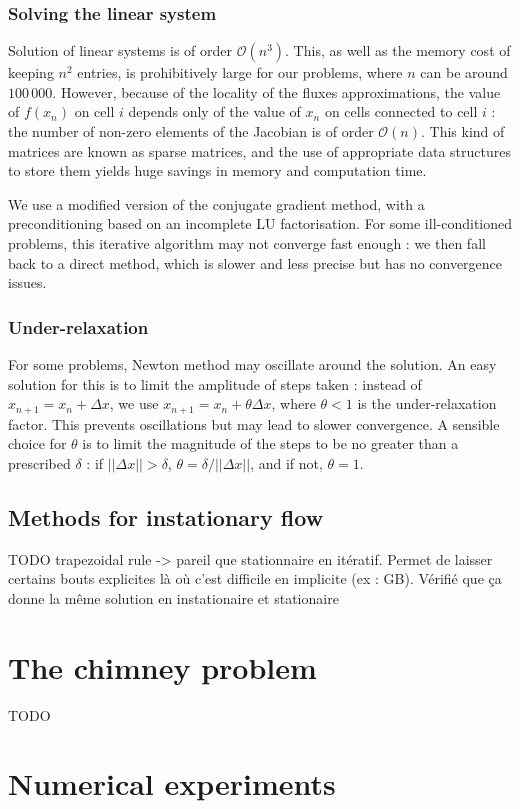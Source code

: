 \documentclass[12pt]{article}
\begin{document}
\subsubsection{Solving the linear system}
Solution of linear systems is of order $\mathcal O (n^3)$. This, as
well as the memory cost of keeping $n^2$ entries, is prohibitively
large for our problems, where $n$ can be around $100\,000$. However,
because of the locality of the fluxes approximations, the value of
$f(x_n)$ on cell $i$ depends only of the value of $x_n$ on cells
connected to cell $i$ : the number of non-zero elements of the
Jacobian is of order $\mathcal O (n)$. This kind of matrices are known
as sparse matrices, and the use of appropriate data structures to
store them yields huge savings in memory and computation time.

We use a modified version of the conjugate gradient method, with a
preconditioning based on an incomplete LU factorisation. For some
ill-conditioned problems, this iterative algorithm may not converge
fast enough : we then fall back to a direct method, which is slower
and less precise but has no convergence issues.

\subsubsection{Under-relaxation}
For some problems, Newton method may oscillate around the solution. An
easy solution for this is to limit the amplitude of steps taken :
instead of $x_{n+1} = x_n + \Delta x$, we use $x_{n+1} = x_n +\theta
\Delta x$, where $\theta < 1$ is the under-relaxation factor. This
prevents oscillations but may lead to slower convergence. A sensible
choice for $\theta$ is to limit the magnitude of the steps to be no
greater than a prescribed $\delta$ : if $||\Delta x|| > \delta$,
$\theta = \delta / ||\Delta x||$, and if not, $\theta = 1$.

\subsection{Methods for instationary flow}
TODO
trapezoidal rule -> pareil que stationnaire en itératif. Permet de
laisser certains bouts explicites là où c'est difficile en implicite
(ex : GB). Vérifié que ça donne la même solution en instationaire et stationaire
\section{The chimney problem}
TODO
\section{Numerical experiments}
\end{document}
